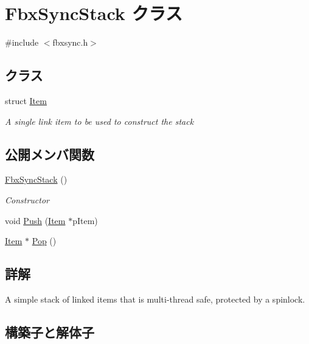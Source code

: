 \hypertarget{class_fbx_sync_stack}{}\section{Fbx\+Sync\+Stack クラス}
\label{class_fbx_sync_stack}


{\ttfamily \#include $<$fbxsync.\+h$>$}

\subsection*{クラス}
\begin{DoxyCompactItemize}
\item 
struct \hyperlink{struct_fbx_sync_stack_1_1_item}{Item}
\begin{DoxyCompactList}\small\item\em A single link item to be used to construct the stack \end{DoxyCompactList}\end{DoxyCompactItemize}
\subsection*{公開メンバ関数}
\begin{DoxyCompactItemize}
\item 
\hyperlink{class_fbx_sync_stack_a39058f505817e4a4739323b3daa8fafe}{Fbx\+Sync\+Stack} ()
\begin{DoxyCompactList}\small\item\em Constructor \end{DoxyCompactList}\item 
void \hyperlink{class_fbx_sync_stack_a1412ced243b15737a27bb4a3b30bd40b}{Push} (\hyperlink{struct_fbx_sync_stack_1_1_item}{Item} $\ast$p\+Item)
\item 
\hyperlink{struct_fbx_sync_stack_1_1_item}{Item} $\ast$ \hyperlink{class_fbx_sync_stack_a13b7a3879bf1dab796985893597d443f}{Pop} ()
\end{DoxyCompactItemize}


\subsection{詳解}
A simple stack of linked items that is multi-\/thread safe, protected by a spinlock. 

\subsection{構築子と解体子}
\mbox{\label{class_fbx_sync_stack_a39058f505817e4a4739323b3daa8fafe}} 
